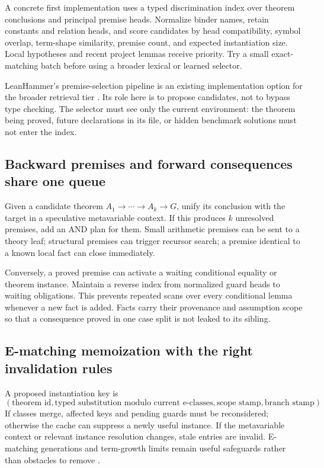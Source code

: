 \documentclass[11pt,letterpaper]{article}
\theoremstyle{definition}\newtheorem{definition}[theorem]{Definition}
\theoremstyle{remark}\newtheorem{remark}[theorem]{Remark}
\begin{document}
A concrete first implementation uses a typed discrimination index over theorem conclusions and principal premise heads. Normalize binder names, retain constants and relation heads, and score candidates by head compatibility, symbol overlap, term-shape similarity, premise count, and expected instantiation size. Local hypotheses and recent project lemmas receive priority. Try a small exact-matching batch before using a broader lexical or learned selector.

LeanHammer's premise-selection pipeline is an existing implementation option for the broader retrieval tier \cite{hammer}. Its role here is to propose candidates, not to bypass type checking. The selector must see only the current environment: the theorem being proved, future declarations in its file, or hidden benchmark solutions must not enter the index.

\subsection{Backward premises and forward consequences share one queue}
Given a candidate theorem $A_1\to\cdots\to A_k\to G$, unify its conclusion with the target in a speculative metavariable context. If this produces $k$ unresolved premises, add an AND plan for them. Small arithmetic premises can be sent to a theory leaf; structural premises can trigger recursor search; a premise identical to a known local fact can close immediately.

Conversely, a proved premise can activate a waiting conditional equality or theorem instance. Maintain a reverse index from normalized guard heads to waiting obligations. This prevents repeated scans over every conditional lemma whenever a new fact is added. Facts carry their provenance and assumption scope so that a consequence proved in one case split is not leaked to its sibling.

\subsection{E-matching memoization with the right invalidation rules}
A proposed instantiation key is
\[
 (\text{theorem id},\text{typed substitution modulo current e-classes},
   \text{scope stamp},\text{branch stamp}).
\]
If classes merge, affected keys and pending guards must be reconsidered; otherwise the cache can suppress a newly useful instance. If the metavariable context or relevant instance resolution changes, stale entries are invalid. E-matching generations and term-growth limits remain useful safeguards rather than obstacles to remove \cite{ematch}.
\end{document}
